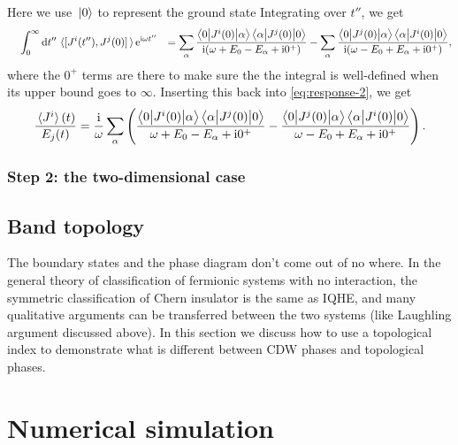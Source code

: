 \documentclass[hyperref, a4paper]{article}
\newcommand*{\ii}{\mathrm{i}}
\newcommand*{\ee}{\mathrm{e}}
\def\\{}%
\begin{document}
Here we use $\ket*{0}$ to represent the ground state 
Integrating over $t''$, we get 
\[
    \begin{aligned}
        &\quad \int_{0}^{\infty} \dd{t''} \expval*{\comm*{J^i(t'')}{J^j(0)}} \ee^{\ii \omega t''} \\
        &= \sum_\alpha \frac{\mel**{0}{J^i(0)}{\alpha} \mel**{\alpha}{J^j(0)}{0}}{\ii (\omega + E_0 - E_\alpha + \ii 0^+)}
        - \sum_\alpha \frac{\mel**{0}{J^j(0)}{\alpha} \mel**{\alpha}{J^i(0)}{0}}{\ii (\omega - E_0 + E_\alpha + \ii 0^+)},
    \end{aligned}
\]
where the $0^+$ terms are there to make sure 
the the integral is well-defined when its upper bound goes to $\infty$.
Inserting this back into \eqref{eq:response-2}, 
we get 
\begin{equation}
    \frac{\expval*{J^i}(t)}{E_j(t)} = \frac{\ii}{\omega} \sum_\alpha \left(
        \frac{\mel**{0}{J^i(0)}{\alpha} \mel**{\alpha}{J^j(0)}{0}}{ \omega + E_0 - E_\alpha + \ii 0^+}
        - \frac{\mel**{0}{J^j(0)}{\alpha} \mel**{\alpha}{J^i(0)}{0}}{\omega - E_0 + E_\alpha + \ii 0^+}
    \right).
\end{equation}

\subsubsection{Step 2: the two-dimensional case}



\subsection{Band topology}

The boundary states and the phase diagram don't come out of no where.
In the general theory of classification of fermionic systems with no interaction, 
the symmetric classification of Chern insulator is the same as IQHE,
and many qualitative arguments can be transferred 
between the two systems
(like Laughling argument discussed above).
In this section we discuss how to use a topological index 
to demonstrate what is different 
between CDW phases and topological phases. 

\section{Numerical simulation}





\end{document}
